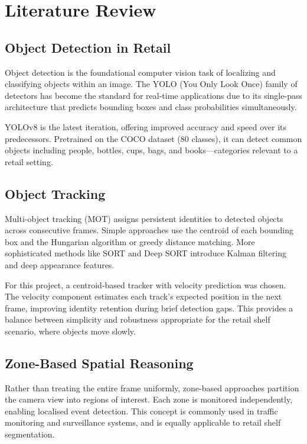 \documentclass[12pt,a4paper]{article}
\begin{document}
\section{Literature Review}

\subsection{Object Detection in Retail}

Object detection is the foundational computer vision task of localizing and classifying objects within an image.
The YOLO (You Only Look Once) family of detectors has become the standard for real-time applications due to its single-pass architecture that predicts bounding boxes and class probabilities simultaneously.

YOLOv8 \cite{ultralytics2023} is the latest iteration, offering improved accuracy and speed over its predecessors.
Pretrained on the COCO dataset (80 classes), it can detect common objects including people, bottles, cups, bags, and books—categories relevant to a retail setting.

\subsection{Object Tracking}

Multi-object tracking (MOT) assigns persistent identities to detected objects across consecutive frames.
Simple approaches use the centroid of each bounding box and the Hungarian algorithm or greedy distance matching.
More sophisticated methods like SORT \cite{bewley2016sort} and Deep SORT \cite{wojke2017deepsort} introduce Kalman filtering and deep appearance features.

For this project, a centroid-based tracker with velocity prediction was chosen.
The velocity component estimates each track's expected position in the next frame, improving identity retention during brief detection gaps.
This provides a balance between simplicity and robustness appropriate for the retail shelf scenario, where objects move slowly.

\subsection{Zone-Based Spatial Reasoning}

Rather than treating the entire frame uniformly, zone-based approaches partition the camera view into regions of interest.
Each zone is monitored independently, enabling localised event detection.
This concept is commonly used in traffic monitoring and surveillance systems, and is equally applicable to retail shelf segmentation.
\end{document}
